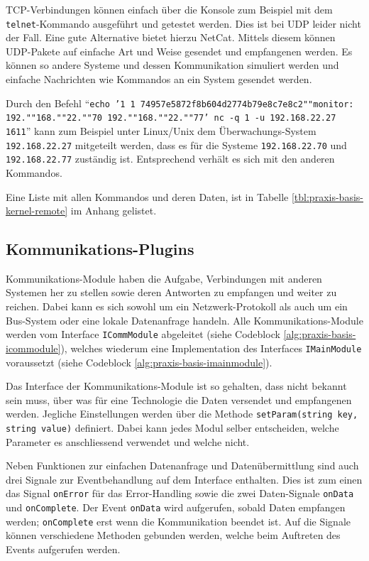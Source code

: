 TCP-Verbindungen k\"onnen einfach \"uber die Konsole zum Beispiel mit dem \texttt{telnet}-Kommando ausgef\"uhrt und getestet werden. Dies ist bei UDP leider nicht der Fall. Eine gute Alternative bietet hierzu NetCat\cite{netcat}. Mittels diesem k\"onnen UDP-Pakete auf einfache Art und Weise gesendet und empfangenen werden. Es k\"onnen so andere Systeme und dessen Kommunikation simuliert werden und einfache Nachrichten wie Kommandos an ein System gesendet werden.

Durch den Befehl "`\texttt{echo '1   1   74957e5872f8b604d2774b79e8c7e8c2""monitor: 192.""168.""22.""70 192.""168.""22.""77' \textbar nc -q 1 -u 192.168.22.27 1611}"' kann zum Beispiel unter Linux/Unix dem \"Uberwachungs-System \texttt{192.168.22.27} mitgeteilt werden, dass es f\"ur die Systeme \texttt{192.168.22.70} und \texttt{192.168.22.77} zust\"andig ist. Entsprechend verh\"alt es sich mit den anderen Kommandos.

Eine Liste mit allen Kommandos und deren Daten, ist in Tabelle \ref{tbl:praxis-basis-kernel-remote} im Anhang gelistet.

\subsection{Kommunikations-Plugins} \label{sec:praxis-basis-comm}
Kommunikations-Module haben die Aufgabe, Verbindungen mit anderen Systemen her zu stellen sowie deren Antworten zu empfangen und weiter zu reichen. Dabei kann es sich sowohl um ein Netzwerk-Protokoll als auch um ein Bus-System oder eine lokale Datenanfrage handeln. Alle Kommunikations-Module werden vom Interface \texttt{ICommModule} abgeleitet (siehe Codeblock \ref{alg:praxis-basis-icommodule}), welches wiederum eine Implementation des Interfaces \texttt{IMainModule} voraussetzt (siehe Codeblock \ref{alg:praxis-basis-imainmodule}).

Das Interface der Kommunikations-Module ist so gehalten, dass nicht bekannt sein muss, \"uber was f\"ur eine Technologie die Daten versendet und empfangenen werden. Jegliche Einstellungen werden \"uber die Methode \texttt{setParam(string key, string value)} definiert. Dabei kann jedes Modul selber entscheiden, welche Parameter es anschliessend verwendet und welche nicht.

Neben Funktionen zur einfachen Datenanfrage und Daten\"ubermittlung sind auch drei Signale zur Eventbehandlung auf dem Interface enthalten. Dies ist zum einen das Signal \texttt{onError} f\"ur das Error-Handling sowie die zwei Daten-Signale \texttt{onData} und \texttt{onComplete}. Der Event \texttt{onData} wird aufgerufen, sobald Daten empfangen werden; \texttt{onComplete} erst wenn die Kommunikation beendet ist. Auf die Signale k\"onnen verschiedene Methoden gebunden werden, welche beim Auftreten des Events aufgerufen werden.

